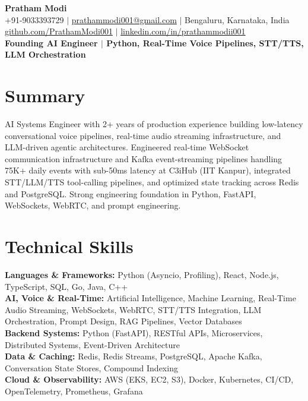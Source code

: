 \documentclass[10pt]{article}
\begin{document}
\begin{center}
{\Huge \textbf{Pratham Modi}} \\[2pt]
+91-9033393729 $\vert$ \href{mailto:prathammodi001@gmail.com}{prathammodi001@gmail.com} $\vert$ Bengaluru, Karnataka, India \\[1pt]
\href{https://github.com/PrathamModi001}{github.com/PrathamModi001} $\vert$ \href{https://www.linkedin.com/in/prathammodii001/}{linkedin.com/in/prathammodii001} \\[2pt]
\textbf{Founding AI Engineer $\vert$ Python, Real-Time Voice Pipelines, STT/TTS, LLM Orchestration}
\end{center}

\vspace{-6pt}
\section{Summary}
AI Systems Engineer with 2+ years of production experience building low-latency conversational voice pipelines, real-time audio streaming infrastructure, and LLM-driven agentic architectures. Engineered real-time WebSocket communication infrastructure and Kafka event-streaming pipelines handling 75K+ daily events with sub-50ms latency at C3iHub (IIT Kanpur), integrated STT/LLM/TTS tool-calling pipelines, and optimized state tracking across Redis and PostgreSQL. Strong engineering foundation in Python, FastAPI, WebSockets, WebRTC, and prompt engineering.

\section{Technical Skills}
\textbf{Languages \& Frameworks:} Python (Asyncio, Profiling), React, Node.js, TypeScript, SQL, Go, Java, C++ \\
\textbf{AI, Voice \& Real-Time:} Artificial Intelligence, Machine Learning, Real-Time Audio Streaming, WebSockets, WebRTC, STT/TTS Integration, LLM Orchestration, Prompt Design, RAG Pipelines, Vector Databases \\
\textbf{Backend Systems:} Python (FastAPI), RESTful APIs, Microservices, Distributed Systems, Event-Driven Architecture \\
\textbf{Data \& Caching:} Redis, Redis Streams, PostgreSQL, Apache Kafka, Conversation State Stores, Compound Indexing \\
\textbf{Cloud \& Observability:} AWS (EKS, EC2, S3), Docker, Kubernetes, CI/CD, OpenTelemetry, Prometheus, Grafana
\end{document}
